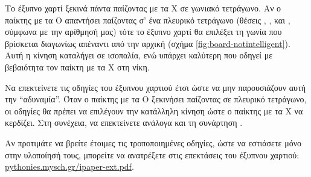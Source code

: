 \documentclass[a4paper,11pt,oneside]{book}
\begin{document}
\begin{exercise}
Το %
έξυπνο χαρτί ξεκινά πάντα παίζοντας με τα Χ σε γωνιακό τετράγωνο. Αν ο παίκτης με τα Ο απαντήσει παίζοντας σ' ένα πλευρικό τετράγωνο (θέσεις , ,  και , σύμφωνα με την αρίθμησή μας) τότε το έξυπνο χαρτί θα επιλέξει τη γωνία που βρίσκεται διαγωνίως απέναντι από την αρχική (σχήμα \ref{fig:board-notintelligent}). Αυτή η κίνηση καταλήγει σε ισοπαλία, ενώ υπάρχει καλύτερη που οδηγεί με βεβαιότητα τον παίκτη με τα Χ στη νίκη.

Να επεκτείνετε τις οδηγίες του έξυπνου χαρτιού έτσι ώστε να μην παρουσιάζουν αυτή την ``αδυναμία''. Όταν ο παίκτης με τα Ο ξεκινήσει παίζοντας σε πλευρικό τετράγωνο, οι οδηγίες θα πρέπει να επιλέγουν την κατάλληλη κίνηση ώστε ο παίκτης με τα Χ να κερδίζει. Στη συνέχεια, να επεκτείνετε ανάλογα και τη συνάρτηση . 

\begin{note}Αν προτιμάτε να βρείτε έτοιμες τις τροποποιημένες οδηγίες, ώστε να εστιάσετε μόνο στην υλοποίησή τους, μπορείτε να ανατρέξετε στις επεκτάσεις του έξυπνου χαρτιού:
\href{http://pythonies.mysch.gr/ipaper-ext.pdf}{\url{pythonies.mysch.gr/ipaper-ext.pdf}}.
\end{note}
\end{exercise}
\end{document}
